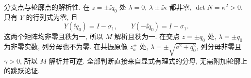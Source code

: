 \par\smallskip\noindent 分支点与轮廓点的解析性.\quad
在 $z=\pm\ii q_0$ 处 $\lambda=0$,
$\lambda\pm\ii\kappa$ 都非零, $\det N=\kappa^2>0$.
只有 $Y$ 的行列式为零, 且
\begin{equation*}
Y(\ii q_0)=I-\sigma_1,\qquad
Y(-\ii q_0)=I+\sigma_1.
\end{equation*}
这两个矩阵均非零且秩为一, 所以 $M$ 解析且秩为一.
在交点 $z=\pm q_0$ 处, $\lambda=\pm q_0$ 为非零实数,
列分母也不为零.
在共振原像 $z_a^\pm$ 处, $\lambda=\pm\sqrt{a^2+q_0^2}$,
列分母非零且 $\gamma>0$, 所以 $M$ 解析并可逆.
全部判断直接来自显式有理式的分母, 无需附加轮廓上的跳跃论证.
